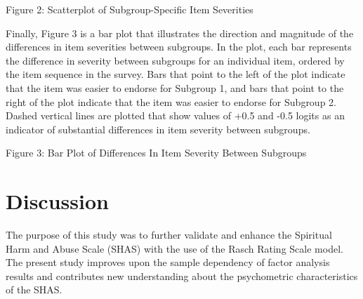 \documentclass[
  letterpaper,
]{article}
\begin{document}
Figure 2: Scatterplot of Subgroup-Specific Item Severities

Finally, Figure 3 is a bar plot that illustrates the direction and
magnitude of the differences in item severities between subgroups. In
the plot, each bar represents the difference in severity between
subgroups for an individual item, ordered by the item sequence in the
survey. Bars that point to the left of the plot indicate that the item
was easier to endorse for Subgroup 1, and bars that point to the right
of the plot indicate that the item was easier to endorse for Subgroup 2.
Dashed vertical lines are plotted that show values of +0.5 and -0.5
logits as an indicator of substantial differences in item severity
between subgroups.

Figure 3: Bar Plot of Differences In Item Severity Between Subgroups


\hypertarget{discussion}{%
\chapter*{Discussion}\label{discussion}}

The purpose of this study was to further validate and enhance the
Spiritual Harm and Abuse Scale (SHAS) with the use of the Rasch Rating
Scale model. The present study improves upon the sample dependency of
factor analysis results and contributes new understanding about the
psychometric characteristics of the SHAS.
\end{document}
